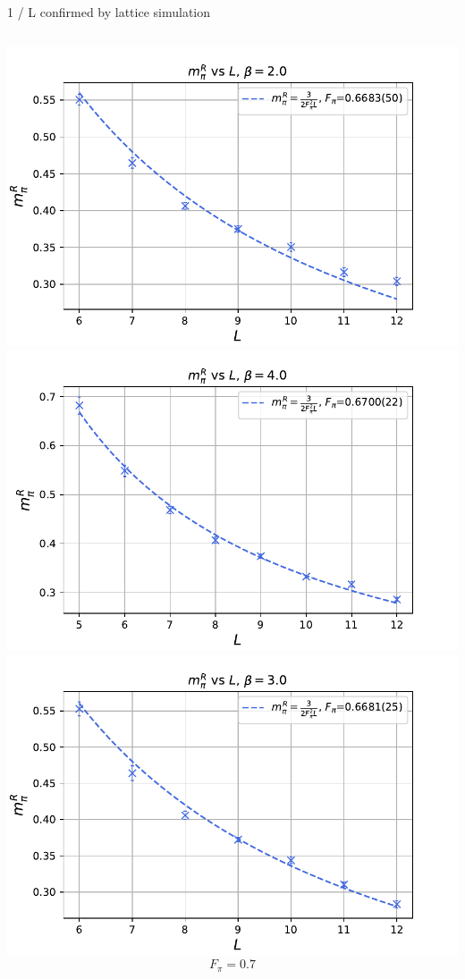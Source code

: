 \documentclass[english]{beamer}
\begin{document}
\begin{frame}{1 / L confirmed by lattice simulation}
  \begin{columns}[t]
      \includegraphics[width=1.0\textwidth]{figs/ResMpiBeta2}
      \includegraphics[width=1.0\textwidth]{figs/ResMpiBeta4}
      \includegraphics[width=1.0\textwidth]{figs/ResMpiBeta3}
      \[
      	F_\pi = 0.7
      \]
  \end{columns}
\end{frame}
\end{document}
